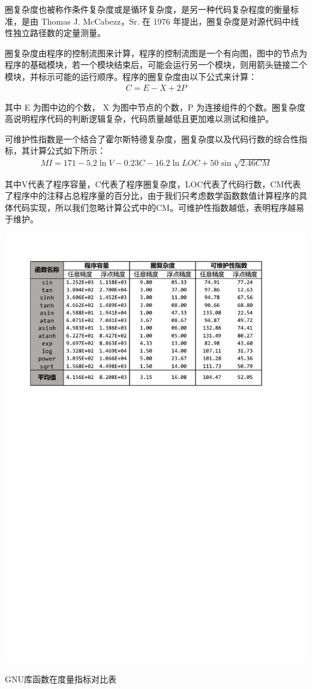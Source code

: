 圈复杂度也被称作条件复杂度或是循环复杂度，是另一种代码复杂程度的衡量标准，是由 Thomas J. McCabezz，Sr. 在 1976 年提出，圈复杂度是对源代码中线性独立路径数的定量测量。

圈复杂度由程序的控制流图\cite{Allen:1970:CFA:390013.808479}来计算，程序的控制流图是一个有向图，图中的节点为程序的基础模块，若一个模块结束后，可能会运行另一个模块，则用箭头链接二个模块，并标示可能的运行顺序。程序的圈复杂度由以下公式来计算：
\begin{align*}
    C = E - X + 2P
\end{align*}

其中 E 为图中边的个数， X 为图中节点的个数，P 为连接组件的个数。圈复杂度高说明程序代码的判断逻辑复杂，代码质量越低且更加难以测试和维护。

可维护性指数是一个结合了霍尔斯特德复杂度，圈复杂度以及代码行数的综合性指标，其计算公式如下所示：
\begin{align*}
    MI = 171 - 5.2\ln V - 0.23C - 16.2\ln LOC + 50\sin\sqrt{2.46CM}
\end{align*}

其中V代表了程序容量，C代表了程序圈复杂度，LOC代表了代码行数，CM代表了程序中的注释占总程序量的百分比，由于我们只考虑数学函数数值计算程序的具体代码实现，所以我们忽略计算公式中的CM。可维护性指数越低，表明程序越易于维护。

\begin{table}[thbp]
    \centering
    \includegraphics[width=\columnwidth]{fig/EvalTable_ComplexMeasurements.pdf}
    \caption{GNU库函数在度量指标对比表} \label{fig:complex_measurements}
 \end{table}

